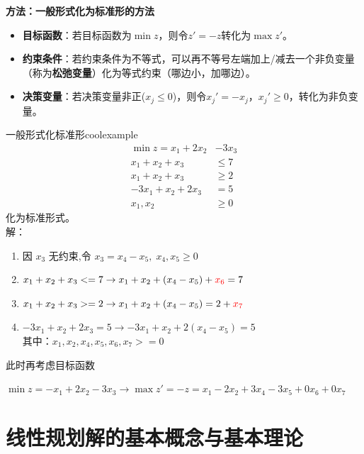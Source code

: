     \begin{notebox}{\textbf{方法：一般形式化为标准形的方法}}
    \begin{itemize}[noitemsep]
        \item \textbf{目标函数}：若目标函数为$\min z$，则令$z'=-z$转化为$\max z'$。
        \item \textbf{约束条件}：若约束条件为不等式，可以再不等号左端加上/减去一个非负变量（称为\textbf{松弛变量}）化为等式约束（哪边小，加哪边）。
        \item \textbf{决策变量}：若决策变量非正($x_j\leq 0$)，则令$x_j'=-x_j$，$x_j'\geq 0$，转化为非负变量。
    \end{itemize}
    \end{notebox}

    \begin{exbox}{一般形式化标准形}{coolexample}
        \begin{align*}
            \min z = x_1 + 2x_2 &- 3x_3 \\
            x_1 + x_2 + x_3 &\leq 7 \\
            x_1 + x_2 + x_3 &\geq 2 \\
            - 3x_1 + x_2 + 2x_3 &= 5 \\
            x_1, x_2 &\geq 0
        \end{align*}
        化为标准形式。\\
        解：
        \begin{enumerate}
            \item 因 $x_3$ 无约束,令 $x_3 = x_4 - x_5,\;x_4,x_5\geq 0$
            \item $x_1 + x_2 + x_3 <  = 7 \rightarrow x_1 + x_2 + (x_4 - x_5) + \textcolor{red}{x_6} = 7$
            \item $x_1 + x_2 + x_3 >  = 2 \rightarrow x_1 + x_2 + (x_4 - x_5) = 2 + \textcolor{red}{x_7}$
            \item $- 3 x_1 + x_2 + 2 x_3 = 5 \rightarrow - 3 x_1 + x_2 + 2\left( {{x}_4 - {x}_5}\right) = 5$
            \\其中：$x_1,x_2,x_4,x_5,x_6,x_7>=0$
        \end{enumerate}
        此时再考虑目标函数

        $\min z=-x_1+2x_2-3x_3 \rightarrow \max z'=-z=x_1-2x_2+3x_4-3x_5+0x_6+0x_7$
    \end{exbox}

    \section{线性规划解的基本概念与基本理论}
    \label{2.3}
